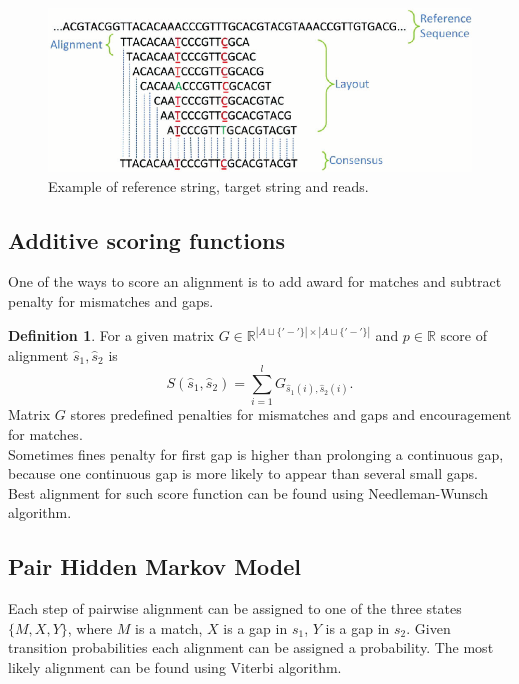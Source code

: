 \documentclass[a4paper, 12pt]{article}
\theoremstyle{definition}
\newtheorem{definition}{Definition}[section]
\theoremstyle{definition}
\theoremstyle{remark}
\newcommand\myworries[1]{\textcolor{red}{#1}}
\begin{document}
\begin{figure}[H]
    \includegraphics[scale=0.5]{aligned_reads.png}
    \centering
    \caption{Example of reference string, target string and reads.}
\end{figure}

\subsection{Additive scoring functions}

One of the ways to score an alignment is to add award for matches and 
subtract penalty for mismatches and gaps. 

\begin{definition}    
    For a given matrix $G \in \mathbb{R}^{|A \sqcup \{ '-' \} | \times |A \sqcup \{ '-' \}|}$ and $p \in \mathbb{R}$ 
    score of alignment $\hat{s}_1, \hat{s}_2$ is 
    $$ S(\hat{s}_1, \hat{s}_2) = \sum_{i = 1}^l G_{\hat{s}_1(i), \hat{s}_2(i)}. $$
    Matrix $G$ stores predefined penalties for mismatches and 
    gaps and encouragement for matches. \\
    Sometimes fines penalty for first gap is higher than prolonging a continuous gap, 
    because one continuous gap is more likely to appear than several small gaps. \\
    Best alignment for such score function can be found using Needleman-Wunsch algorithm.

\end{definition}

\subsection{Pair Hidden Markov Model}
Each step of pairwise alignment can be assigned to one of 
the three states $\{ M, X, Y\}$, where $M$ is a match, 
$X$ is a gap in $s_1$, $Y$ is a gap in $s_2$. 
Given transition probabilities each alignment can be assigned a probability.
The most likely alignment can be found using Viterbi algorithm.
\end{document}
